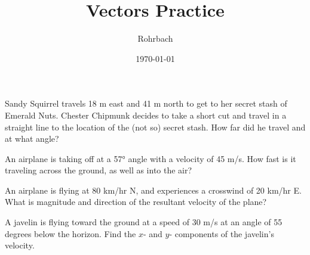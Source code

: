 \documentclass[10pt]{exam}
\title{Vectors Practice}
\author{Rohrbach}
\date{\today}
\begin{document}
\maketitle


\begin{questions}


\question
  Sandy Squirrel travels 18 m east and 41 m north to get to her secret stash of Emerald Nuts.  Chester Chipmunk decides to take a short cut and travel in a straight line to the location of the (not so) secret stash.  How far did he travel and at what angle?
  \vs

\question
  An airplane is taking off at a 57° angle with a velocity of 45 m/s.  How fast is it traveling across the ground, as well as into the air?
  \vs

\pagebreak

\question
  An airplane is flying at 80 km/hr N, and experiences a crosswind of 20 km/hr E.  What is magnitude and direction of the resultant velocity of the plane?
  \vs

\question
  A javelin is flying toward the ground at a speed of 30 m/s at an angle of 55 degrees below the horizon.  Find the $x$- and $y$- components of the javelin's velocity.
  \vs


\end{questions}
\end{document}
